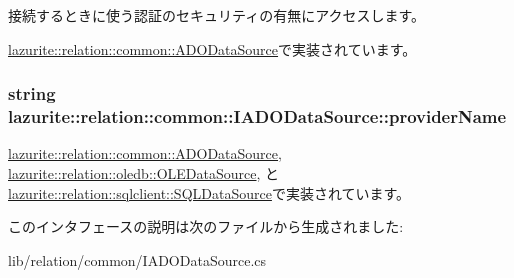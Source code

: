 接続するときに使う認証のセキュリティの有無にアクセスします。 

\hyperlink{classlazurite_1_1relation_1_1common_1_1_a_d_o_data_source_a119ec013a937e5e9caa70c3647e78dae}{lazurite::relation::common::ADODataSource}で実装されています。\hypertarget{interfacelazurite_1_1relation_1_1common_1_1_i_a_d_o_data_source_a19f2ca3d6bc754ef3e2f2a7ff88f778c}{
\subsubsection[{providerName}]{\setlength{\rightskip}{0pt plus 5cm}string lazurite::relation::common::IADODataSource::providerName}}
\label{interfacelazurite_1_1relation_1_1common_1_1_i_a_d_o_data_source_a19f2ca3d6bc754ef3e2f2a7ff88f778c}


\hyperlink{classlazurite_1_1relation_1_1common_1_1_a_d_o_data_source_ad238c170cf658cfdc3a1cf1843aeb956}{lazurite::relation::common::ADODataSource}, \hyperlink{classlazurite_1_1relation_1_1oledb_1_1_o_l_e_data_source_a69a5bde74764439a3b30a1e7787339ce}{lazurite::relation::oledb::OLEDataSource}, と \hyperlink{classlazurite_1_1relation_1_1sqlclient_1_1_s_q_l_data_source_afb9ccecb64b77e0ff36d1b55a52af87f}{lazurite::relation::sqlclient::SQLDataSource}で実装されています。

このインタフェースの説明は次のファイルから生成されました:\begin{DoxyCompactItemize}
\item 
lib/relation/common/IADODataSource.cs\end{DoxyCompactItemize}

